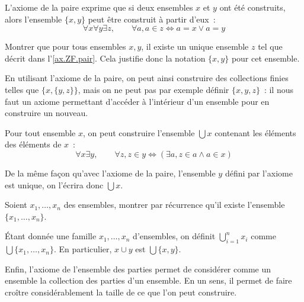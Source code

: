 \begin{axiom}[Paire]\label{ax.ZF.pair}
  L'axiome de la paire exprime que si deux ensembles $x$ et $y$ ont été
  construits, alors l'ensemble $\{x,y\}$ peut être construit à partir d'eux~:
  \[\forall x \forall y \exists z, \qquad\forall a, a \in z \iff
  a = x \lor a = y\]
\end{axiom}

\begin{exercise}
  Montrer que pour tous ensembles $x,y$, il existe un unique ensemble $z$ tel
  que décrit dans l'\cref{ax.ZF.pair}. Cela justifie donc la notation $\{x,y\}$
  pour cet ensemble.
\end{exercise}

En utilisant l'axiome de la paire, on peut ainsi construire des collections
finies telles que $\{x,\{y,z\}\}$, mais on ne peut pas par exemple définir
$\{x,y,z\}$~: il nous faut un axiome permettant d'accéder à l'intérieur d'un
ensemble pour en construire un nouveau.

\begin{axiom}[Union]\label{ax.ZF.union}
  Pour tout ensemble $x$, on peut construire l'ensemble $\bigcup x$ contenant
  les éléments des éléments de $x$~:
  \[\forall x \exists y,\qquad \forall z, z\in y \iff
  (\exists a, z \in a \land a \in x)\]
\end{axiom}

\begin{notation}
  De la même façon qu'avec l'axiome de la paire, l'ensemble $y$ défini par
  l'axiome est unique, on l'écrira donc $\bigcup x$.
\end{notation}

\begin{exercise}
  Soient $x_1,\ldots,x_n$ des ensembles, montrer par récurrence qu'il existe
  l'ensemble $\{x_1,\ldots,x_n\}$.
\end{exercise}

\begin{notation}
  \'Etant donnée une famille $x_1,\ldots,x_n$ d'ensembles, on définit
  $\displaystyle \bigcup_{i = 1}^n x_i$ comme $\bigcup\{x_1,\ldots,x_n\}$. En
  particulier, $x \cup y$ est $\bigcup\{x,y\}$.
\end{notation}

Enfin, l'axiome de l'ensemble des parties permet de considérer comme un ensemble
la collection des parties d'un ensemble. En un sens, il permet de faire croître
considérablement la taille de ce que l'on peut construire.

